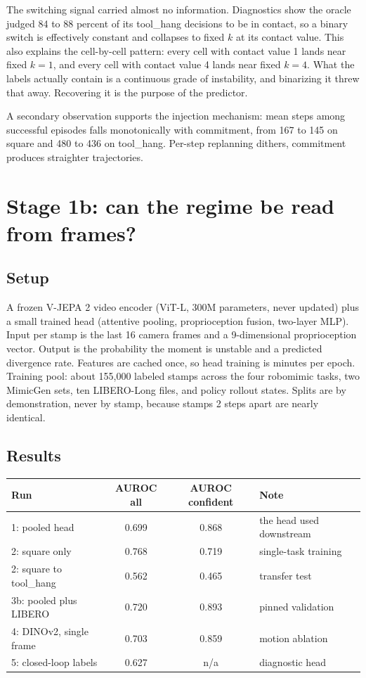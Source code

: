 \documentclass[11pt]{article}
\begin{document}
The switching signal carried almost no information. Diagnostics show the
oracle judged 84 to 88 percent of its tool\_hang decisions to be in contact,
so a binary switch is effectively constant and collapses to fixed $k$ at its
contact value. This also explains the cell-by-cell pattern: every cell with
contact value 1 lands near fixed $k{=}1$, and every cell with contact value 4
lands near fixed $k{=}4$. What the labels actually contain is a continuous
grade of instability, and binarizing it threw that away. Recovering it is the
purpose of the predictor.

A secondary observation supports the injection mechanism: mean steps among
successful episodes falls monotonically with commitment, from 167 to 145 on
square and 480 to 436 on tool\_hang. Per-step replanning dithers, commitment
produces straighter trajectories.

\section{Stage 1b: can the regime be read from frames?}

\subsection{Setup}

A frozen V-JEPA 2 video encoder (ViT-L, 300M parameters, never updated) plus
a small trained head (attentive pooling, proprioception fusion, two-layer
MLP). Input per stamp is the last 16 camera frames and a 9-dimensional
proprioception vector. Output is the probability the moment is unstable and a
predicted divergence rate. Features are cached once, so head training is
minutes per epoch. Training pool: about 155{,}000 labeled stamps across the
four robomimic tasks, two MimicGen sets, ten LIBERO-Long files, and policy
rollout states. Splits are by demonstration, never by stamp, because stamps 2
steps apart are nearly identical.

\subsection{Results}

\begin{center}
\small
\begin{tabular}{@{}lccl@{}}
\toprule
Run & AUROC all & AUROC confident & Note \\
\midrule
1: pooled head            & 0.699 & 0.868 & the head used downstream \\
2: square only            & 0.768 & 0.719 & single-task training \\
2: square to tool\_hang   & 0.562 & 0.465 & transfer test \\
3b: pooled plus LIBERO    & 0.720 & 0.893 & pinned validation \\
4: DINOv2, single frame   & 0.703 & 0.859 & motion ablation \\
5: closed-loop labels     & 0.627 & n/a   & diagnostic head \\
\bottomrule
\end{tabular}
\end{center}
\end{document}
